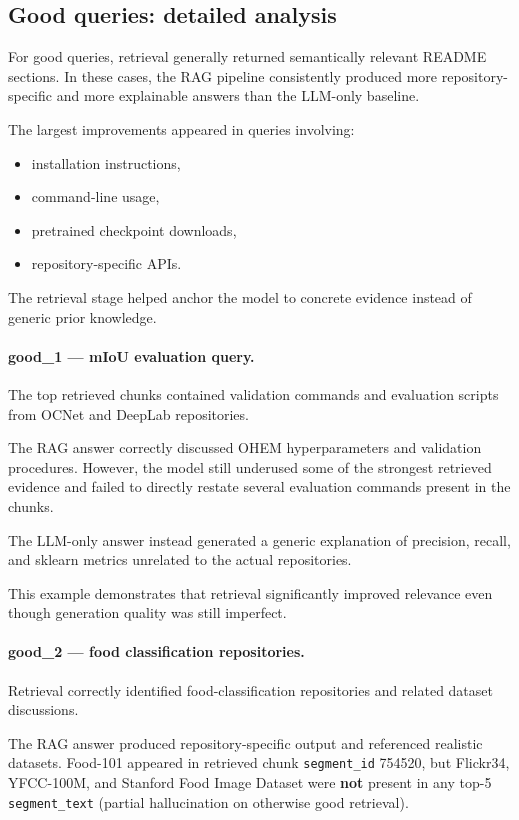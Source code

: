 \documentclass[11pt,a4paper]{article}
\begin{document}
\subsection{Good queries: detailed analysis}
For good queries, retrieval generally returned semantically relevant README sections. In these cases, the RAG pipeline consistently produced more repository-specific and more explainable answers than the LLM-only baseline.

The largest improvements appeared in queries involving:

\begin{itemize}
  \item installation instructions,
  \item command-line usage,
  \item pretrained checkpoint downloads,
  \item repository-specific APIs.
\end{itemize}

The retrieval stage helped anchor the model to concrete evidence instead of generic prior knowledge.

\paragraph{good\_1 --- mIoU evaluation query.}
The top retrieved chunks contained validation commands and evaluation scripts from OCNet and DeepLab repositories.

The RAG answer correctly discussed OHEM hyperparameters and validation procedures. However, the model still underused some of the strongest retrieved evidence and failed to directly restate several evaluation commands present in the chunks.

The LLM-only answer instead generated a generic explanation of precision, recall, and sklearn metrics unrelated to the actual repositories.

This example demonstrates that retrieval significantly improved relevance even though generation quality was still imperfect.

\paragraph{good\_2 --- food classification repositories.}
Retrieval correctly identified food-classification repositories and related dataset discussions.

The RAG answer produced repository-specific output and referenced realistic datasets. Food-101 appeared in retrieved chunk \texttt{segment\_id} 754520, but Flickr34, YFCC-100M, and Stanford Food Image Dataset were \textbf{not} present in any top-5 \texttt{segment\_text} (partial hallucination on otherwise good retrieval).
\end{document}
